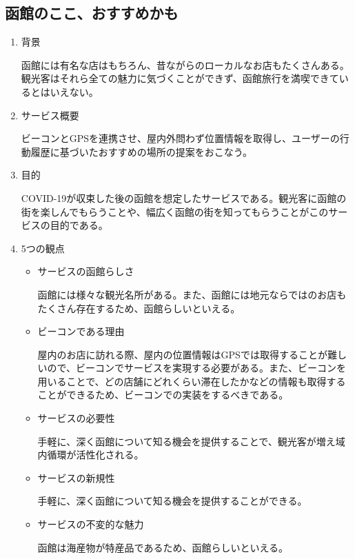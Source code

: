 \subsection{函館のここ、おすすめかも}
\begin{enumerate}
    \item 背景
    \par 函館には有名な店はもちろん、昔ながらのローカルなお店もたくさんある。観光客はそれら全ての魅力に気づくことができず、函館旅行を満喫できているとはいえない。
    \item サービス概要
    \par ビーコンとGPSを連携させ、屋内外問わず位置情報を取得し、ユーザーの行動履歴に基づいたおすすめの場所の提案をおこなう。
    \item 目的
    \par COVID-19が収束した後の函館を想定したサービスである。観光客に函館の街を楽しんでもらうことや、幅広く函館の街を知ってもらうことがこのサービスの目的である。
    \item 5つの観点
    \begin{itemize}
        \item サービスの函館らしさ
        \par 函館には様々な観光名所がある。また、函館には地元ならではのお店もたくさん存在するため、函館らしいといえる。
        \item ビーコンである理由
        \par 屋内のお店に訪れる際、屋内の位置情報はGPSでは取得することが難しいので、ビーコンでサービスを実現する必要がある。また、ビーコンを用いることで、どの店舗にどれくらい滞在したかなどの情報も取得することができるため、ビーコンでの実装をするべきである。
        \item サービスの必要性
        \par 手軽に、深く函館について知る機会を提供することで、観光客が増え域内循環が活性化される。
        \item サービスの新規性
        \par 手軽に、深く函館について知る機会を提供することができる。
        \item サービスの不変的な魅力
        \par 函館は海産物が特産品であるため、函館らしいといえる。
    \end{itemize}
\end{enumerate}

